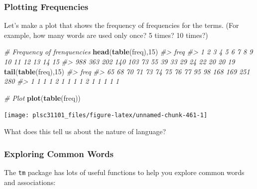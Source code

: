 \documentclass[
]{book}
\newenvironment{Shaded}{\begin{snugshade}}{\end{snugshade}}
\newcommand{\CommentTok}[1]{\textcolor[rgb]{0.56,0.35,0.01}{\textit{#1}}}
\newcommand{\DecValTok}[1]{\textcolor[rgb]{0.00,0.00,0.81}{#1}}
\newcommand{\KeywordTok}[1]{\textcolor[rgb]{0.13,0.29,0.53}{\textbf{#1}}}
\newcommand{\NormalTok}[1]{#1}
\begin{document}
\hypertarget{plotting-frequencies}{%
\subsubsection*{Plotting Frequencies}\label{plotting-frequencies}}

Let's make a plot that shows the frequency of frequencies for the terms. (For example, how many words are used only once? 5 times? 10 times?)

\begin{Shaded}
\begin{Highlighting}[]
\CommentTok{# Frequency of frenquencies}
\KeywordTok{head}\NormalTok{(}\KeywordTok{table}\NormalTok{(freq),}\DecValTok{15}\NormalTok{)}
\CommentTok{#> freq}
\CommentTok{#>   1   2   3   4   5   6   7   8   9  10  11  12  13  14  15 }
\CommentTok{#> 988 363 202 140 103  73  55  39  33  29  24  22  20  20  19}
\KeywordTok{tail}\NormalTok{(}\KeywordTok{table}\NormalTok{(freq),}\DecValTok{15}\NormalTok{)}
\CommentTok{#> freq}
\CommentTok{#>  65  68  70  71  73  74  75  76  77  95  98 168 169 251 280 }
\CommentTok{#>   1   1   1   1   2   1   1   1   1   2   1   1   1   1   1}

\CommentTok{# Plot}
\KeywordTok{plot}\NormalTok{(}\KeywordTok{table}\NormalTok{(freq))}
\end{Highlighting}
\end{Shaded}

\begin{center}\texttt{[image: plsc31101\_files/figure-latex/unnamed-chunk-461-1]} \end{center}

What does this tell us about the nature of language?

\hypertarget{exploring-common-words}{%
\subsubsection*{Exploring Common Words}\label{exploring-common-words}}

The \texttt{tm} package has lots of useful functions to help you explore common words and associations:
\end{document}
